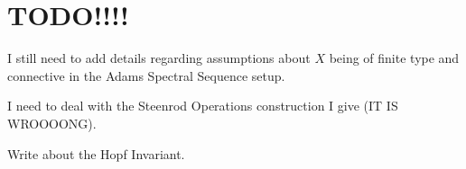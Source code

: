 

\section{TODO!!!!}

I still need to add details regarding assumptions about $X$ being of finite type and connective in the Adams Spectral Sequence setup.

I need to deal with the Steenrod Operations construction I give (IT IS WROOOONG).

Write about the Hopf Invariant.  
